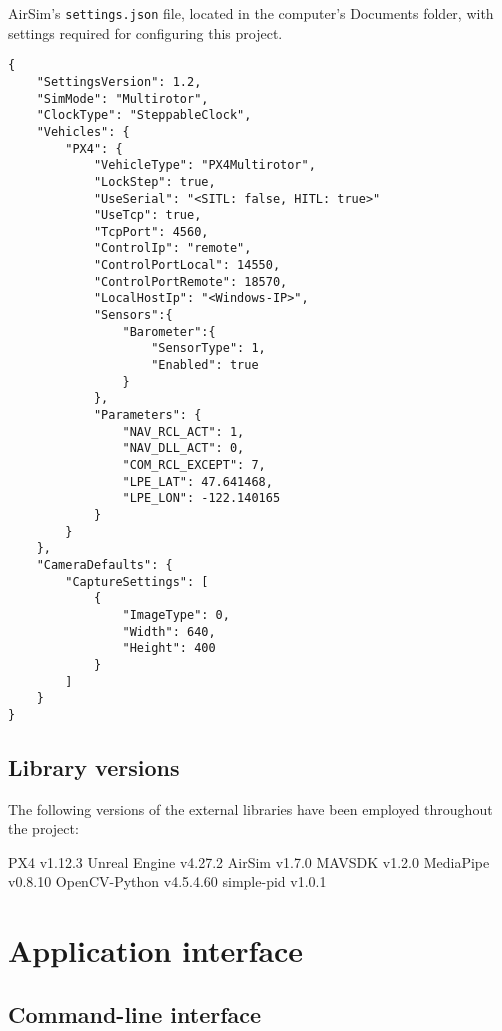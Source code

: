 \begin{listing}[h]
    \caption{AirSim's \texttt{settings.json} file, located in the computer's Documents folder, with settings required for configuring this project.}
    \label{lst:airsim-settings}
    \begin{verbatim}
{
    "SettingsVersion": 1.2,
    "SimMode": "Multirotor",
    "ClockType": "SteppableClock",
    "Vehicles": {
        "PX4": {
            "VehicleType": "PX4Multirotor",
            "LockStep": true,
            "UseSerial": "<SITL: false, HITL: true>"
            "UseTcp": true,
            "TcpPort": 4560,
            "ControlIp": "remote",
            "ControlPortLocal": 14550,
            "ControlPortRemote": 18570,
            "LocalHostIp": "<Windows-IP>",
            "Sensors":{
                "Barometer":{
                    "SensorType": 1,
                    "Enabled": true
                }
            },
            "Parameters": {
                "NAV_RCL_ACT": 1,
                "NAV_DLL_ACT": 0,
                "COM_RCL_EXCEPT": 7,
                "LPE_LAT": 47.641468,
                "LPE_LON": -122.140165
            }
        }
    },
    "CameraDefaults": {
        "CaptureSettings": [
            {
                "ImageType": 0,
                "Width": 640,
                "Height": 400
            }
        ]
    }
}
    \end{verbatim}
\end{listing}

\section{Library versions}

The following versions of the external libraries have been employed throughout the project:

PX4 v1.12.3
Unreal Engine v4.27.2
AirSim v1.7.0
MAVSDK v1.2.0
MediaPipe v0.8.10
OpenCV-Python v4.5.4.60
simple-pid v1.0.1


\chapter{Application interface}

\section{Command-line interface}
\label{app:cli}

